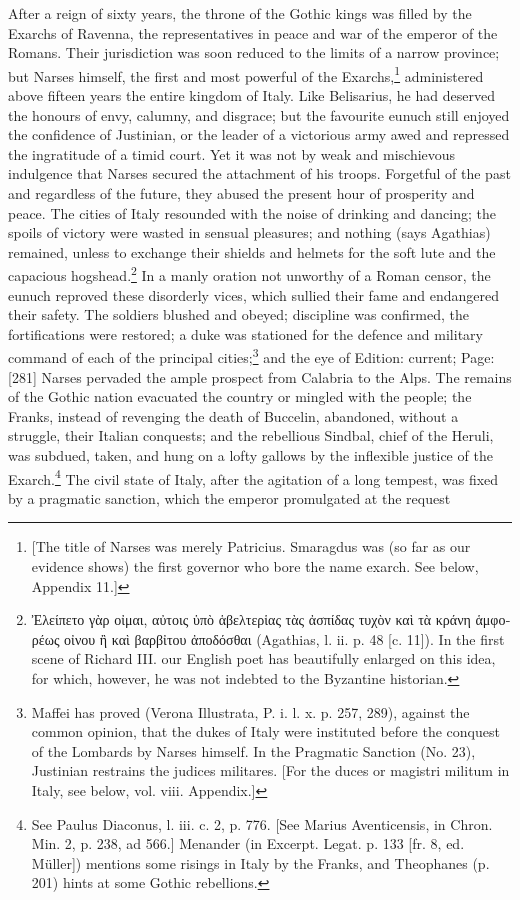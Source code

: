 After a reign of sixty years, the throne of the Gothic kings was filled by the Exarchs of Ravenna, the representatives in peace and war of the emperor of the Romans. Their jurisdiction was soon reduced to the limits of a narrow province; but Narses himself, the first and most powerful of the Exarchs,\footnote{[The title of Narses was merely Patricius. Smaragdus was (so far as our evidence shows) the first governor who bore the name exarch. See below, Appendix 11.]} administered above fifteen years the entire kingdom of Italy. Like Belisarius, he had deserved the honours of envy, calumny, and disgrace; but the favourite eunuch still enjoyed the confidence of Justinian, or the leader of a victorious army awed and repressed the ingratitude of a timid court. Yet it was not by weak and mischievous indulgence that Narses secured the attachment of his troops. Forgetful of the past and regardless of the future, they abused the present hour of prosperity and peace. The cities of Italy resounded with the noise of drinking and dancing; the spoils of victory were wasted in sensual pleasures; and nothing (says Agathias) remained, unless to exchange their shields and helmets for the soft lute and the capacious hogshead.\footnote{\textgreek{\texthebrew{Ἐ}λείπετο γ\texthebrew{ὰ}ρ ο\texthebrew{ἰ}μαι, α\texthebrew{ὐ}τοις \texthebrew{ὑ}π\texthebrew{ὸ ἁ}βελτερ\texthebrew{ἱ}ας τ\texthebrew{ὰ}ς \texthebrew{ἀ}σπίδας τυχ\texthebrew{ὸ}ν κα\texthebrew{ὶ} τ\texthebrew{ὰ} κράνη \texthebrew{ἁ}μφορέως ο\texthebrew{ἰ}νου \texthebrew{ἢ} κα\texthebrew{ὶ} βαρβ\texthebrew{ἰ}του \texthebrew{ἀ}ποδόσθαι} (Agathias, l. ii. p. 48 [c. 11]). In the first scene of Richard III. our English poet has beautifully enlarged on this idea, for which, however, he was not indebted to the Byzantine historian.} In a manly oration not unworthy of a Roman censor, the eunuch reproved these disorderly vices, which sullied their fame and endangered their safety. The soldiers blushed and obeyed; discipline was confirmed, the fortifications were restored; a duke was stationed for the defence and military command of each of the principal cities;\footnote{Maffei has proved (Verona Illustrata, P. i. l. x. p. 257, 289), against the common opinion, that the dukes of Italy were instituted before the conquest of the Lombards by Narses himself. In the Pragmatic Sanction (No. 23), Justinian restrains the judices militares. [For the duces or magistri militum in Italy, see below, vol. viii. Appendix.]} and the eye of Edition: current; Page: [281] Narses pervaded the ample prospect from Calabria to the Alps. The remains of the Gothic nation evacuated the country or mingled with the people; the Franks, instead of revenging the death of Buccelin, abandoned, without a struggle, their Italian conquests; and the rebellious Sindbal, chief of the Heruli, was subdued, taken, and hung on a lofty gallows by the inflexible justice of the Exarch.\footnote{See Paulus Diaconus, l. iii. c. 2, p. 776. [See Marius Aventicensis, in Chron. Min. 2, p. 238, ad 566.] Menander (in Excerpt. Legat. p. 133 [fr. 8, ed. Müller]) mentions some risings in Italy by the Franks, and Theophanes (p. 201) hints at some Gothic rebellions.} The civil state of Italy, after the agitation of a long tempest, was fixed by a pragmatic sanction, which the emperor promulgated at the request 